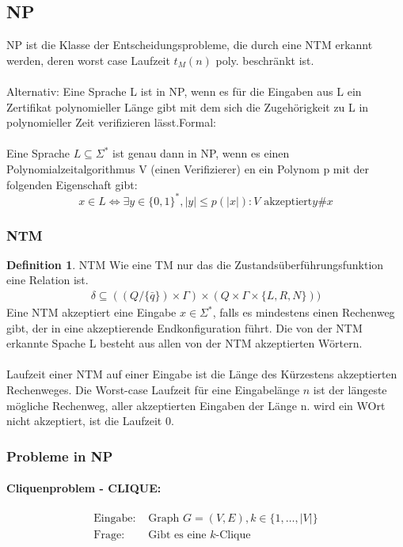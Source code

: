 \documentclass[a4paper, 10pt]{article}
\theoremstyle{definition}
\newtheorem{definition}{Definition}[section]
\newcommand{\kleene}{\Sigma^*}
\begin{document}
\subsection{NP}
NP ist die Klasse der Entscheidungsprobleme, die durch eine NTM erkannt werden, deren worst case Laufzeit $t_M(n)$ poly. beschränkt ist.\\ \\ 
Alternativ: Eine Sprache L ist in NP, wenn es für die Eingaben aus L ein Zertifikat polynomieller Länge gibt mit dem sich die Zugehörigkeit zu L in polynomieller Zeit verifizieren lässt.Formal:\\ \\ 
Eine Sprache $L\subseteq\kleene$ ist genau dann in NP, wenn es einen Polynomialzeitalgorithmus V (einen Verifizierer) en ein Polynom p mit der folgenden Eigenschaft gibt:
\begin{equation*}
    x\in L \Leftrightarrow\exists y\in\{0,1\}^*,|y|\leq p(|x|): V \text{ akzeptiert}y\#x
\end{equation*}

\subsubsection{NTM}
\begin{definition}{NTM}
Wie eine TM nur das die Zustandsüberführungsfunktion eine Relation ist.
\begin{align*}
    \delta\subseteq((Q/\{\bar{q}\})\times\Gamma)\times(Q\times\Gamma\times\{L,R,N\}))
\end{align*}
Eine NTM akzeptiert eine Eingabe $x\in\kleene$, falls es mindestens einen Rechenweg gibt, der in eine akzeptierende Endkonfiguration führt. Die von der NTM erkannte Spache L besteht aus allen von der NTM akzeptierten Wörtern.\\ \\
Laufzeit einer NTM auf einer Eingabe ist die Länge des Kürzestens akzeptierten Rechenweges.
Die Worst-case Laufzeit für eine Eingabelänge $n$ ist der längeste mögliche Rechenweg, aller akzeptierten Eingaben der Länge n. wird ein WOrt nicht akzeptiert, ist die Laufzeit 0.
\end{definition}
\subsubsection{Probleme in NP}
\paragraph{Cliquenproblem - CLIQUE:}
\begin{align*}
    \text{Eingabe}:&\text{ Graph }G=(V,E), k\in\{1,\dots,|V|\}\\
    \text{Frage}:&\text{ Gibt es eine $k$-Clique}
\end{align*}
\end{document}
